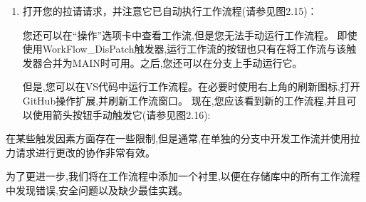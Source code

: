 \begin{enumerate}
\begin{shell}
$ git push -u origin new-workflow
\end{shell}

\item 
接下来,我们将为我们的新分支机构创建拉动请求。当我们使用pull\_request触发器时,这将自动运行我们的新工作流程。转到您的浏览器中的存储库,然后导航以拉出请求。git将检测到您已经推出了一个新分支,并将为您提供创建拉动请求的选项(比较和拉请请求,请参见图2.13):

\myGraphic{0.4}{content/chapter2/images/13.png}{图2.13  ---  在浏览器中创建一个新的pull请求}

只需要保留默认的标题(你之前添加的提交信息)，然后点击Create pull request(见图2.14)：

\myGraphic{0.4}{content/chapter2/images/14.png}{图2.14  ---  创建带有标题和描述的拉取请求}

您还可以使用GitHub CLI创建拉动请求：

\begin{shell}
$ gh pr create --fill
\end{shell}

\begin{myTip}{GitHub CLI}
在整本书中,我们将使用github cli(\url{https://cli.github.com/})。它适用于所有平台和许多包装管理器(Homebrew,Winget,RPM等)。有关更多安装说明,请参见\url{https://github.com/cli/cli/cli#installation}。安装后,您必须使用gh auth login登录(请参阅\url{https://cli.github.com/manual/gh_auth_login})进行身份验证。
\end{myTip}

\item 
打开您的拉请请求，并注意它已自动执行工作流程(请参见图2.15)：


您还可以在“操作”选项卡中查看工作流,但是您无法手动运行工作流程。 即使使用WorkFlow\_DisPatch触发器,运行工作流的按钮也只有在将工作流与该触发器合并为MAIN时可用。之后,您还可以在分支上手动运行它。

但是,您可以在VS代码中运行工作流程。在必要时使用右上角的刷新图标,打开GitHub操作扩展,并刷新工作流窗口。 现在,您应该看到新的工作流程,并且可以使用箭头按钮手动触发它(请参见图2.16):

\end{enumerate}


在某些触发因素方面存在一些限制,但是通常,在单独的分支中开发工作流并使用拉力请求进行更改的协作非常有效。


为了更进一步,我们将在工作流程中添加一个衬里,以便在存储库中的所有工作流程中发现错误,安全问题以及缺少最佳实践。